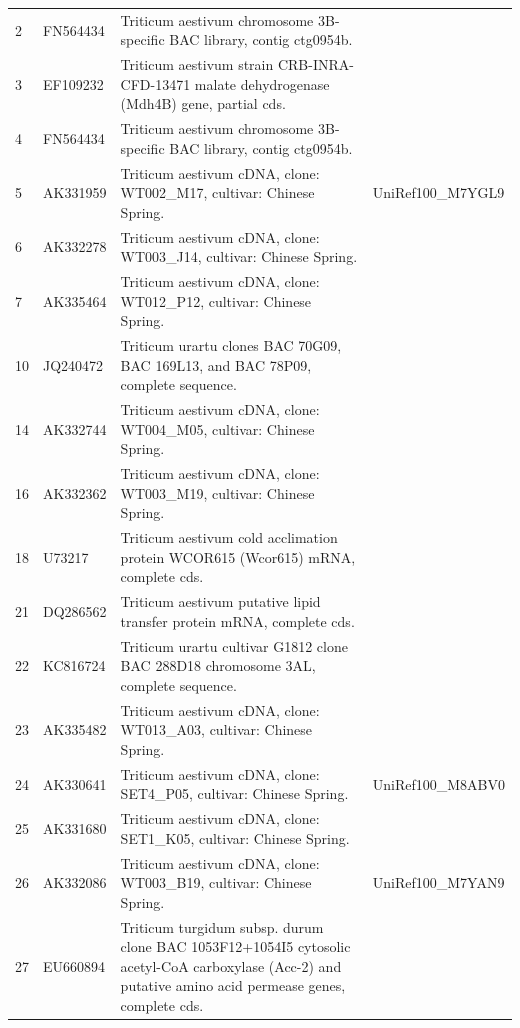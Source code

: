 \documentclass[10.9pt]{article} %
\begin{document}
\begingroup
\footnotesize{
\begin{longtable}{|p{1.5cm}|p{2cm}|p{9cm}|p{3cm}|}
\hline
\centering{\bf{Contig}} &\centering{\bf{Accession}} &\centering{\bf{Description}} &\centering{\bf{Uniref - EBI}}\\
\endhead\hline
2 & FN564434 & Triticum aestivum chromosome 3B-specific BAC library, contig ctg0954b. & \\
\hline
3 & EF109232 & Triticum aestivum strain CRB-INRA-CFD-13471 malate dehydrogenase (Mdh4B) gene, partial cds. & \\
\hline
4 & FN564434 & Triticum aestivum chromosome 3B-specific BAC library, contig ctg0954b. & \\
\hline
5 & AK331959 & Triticum aestivum cDNA, clone: WT002\_M17, cultivar: Chinese Spring. & UniRef100\_M7YGL9\\
\hline
6 & AK332278 & Triticum aestivum cDNA, clone: WT003\_J14, cultivar: Chinese Spring. & \\
\hline
7 & AK335464 & Triticum aestivum cDNA, clone: WT012\_P12, cultivar: Chinese Spring. & \\
\hline
10 & JQ240472 & Triticum urartu clones BAC 70G09, BAC 169L13, and BAC 78P09, complete sequence. & \\
\hline
14 & AK332744 & Triticum aestivum cDNA, clone: WT004\_M05, cultivar: Chinese Spring. & \\
\hline
16 & AK332362 & Triticum aestivum cDNA, clone: WT003\_M19, cultivar: Chinese Spring. & \\
\hline
18 & U73217 & Triticum aestivum cold acclimation protein WCOR615 (Wcor615) mRNA, complete cds. & \\
\hline
21 & DQ286562 & Triticum aestivum putative lipid transfer protein mRNA, complete cds. & \\
\hline
22 & KC816724 & Triticum urartu cultivar G1812 clone BAC 288D18 chromosome 3AL, complete sequence. & \\
\hline
23 & AK335482 & Triticum aestivum cDNA, clone: WT013\_A03, cultivar: Chinese Spring. & \\
\hline
24 & AK330641 & Triticum aestivum cDNA, clone: SET4\_P05, cultivar: Chinese Spring. & UniRef100\_M8ABV0\\
\hline
25 & AK331680 & Triticum aestivum cDNA, clone: SET1\_K05, cultivar: Chinese Spring. & \\
\hline
26 & AK332086 & Triticum aestivum cDNA, clone: WT003\_B19, cultivar: Chinese Spring. & UniRef100\_M7YAN9\\
\hline
27 & EU660894 & Triticum turgidum subsp. durum clone BAC 1053F12+1054I5 cytosolic acetyl-CoA carboxylase (Acc-2) and putative amino acid permease genes, complete cds. & \\

\end{longtable}}
\end{document}
